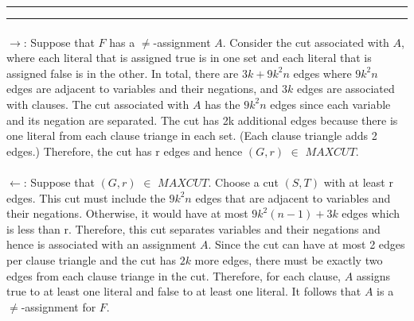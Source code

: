 \documentclass[11pt]{article}
\newcounter{questionCounter}
\newcounter{partCounter}[questionCounter]
\newenvironment{question}[2][\arabic{questionCounter}]{%
    \setcounter{partCounter}{0}%
    \vspace{.25in} \hrule \vspace{0.5em}%
        \noindent{\bf #2}%
    \vspace{0.8em} \hrule \vspace{.10in}%
    \addtocounter{questionCounter}{1}%
}{}
\begin{document}
\begin{question}{NP-Completeness}
\begin{enumerate}[(a)]
\paragraph{}
$\rightarrow$: Suppose that $F$ has a $\neq$-assignment $A$.  Consider the cut associated with $A$, where each literal that is assigned true is in one set and each literal that is assigned false is in the other.  In total, there are $3k + 9k^{2}n$ edges where $9k^{2}n$ edges are adjacent to variables and their negations, and $3k$ edges are associated with clauses.  The cut associated with $A$ has the $9k^{2}n$ edges since each variable and its negation are separated.  The cut has 2k additional edges because there is one literal from each clause triange in each set.  (Each clause triangle adds 2 edges.)  Therefore, the cut has r edges and hence $(G,r)$ $\in$ $MAXCUT$.

\paragraph{}
$\leftarrow$: Suppose that $(G,r)$ $\in$ $MAXCUT$.  Choose a cut $(S,T)$ with at least r edges.  This cut must include the $9k^{2}n$ edges that are adjacent to variables and their negations.  Otherwise, it would have at most $9k^{2}(n-1) + 3k$ edges which is less than r.  Therefore, this cut separates variables and their negations and hence is associated with an assignment $A$.  Since the cut can have at most 2 edges per clause triangle and the cut has $2k$ more edges, there must be exactly two edges from each clause triange in the cut.  Therefore, for each clause, $A$ assigns true to at least one literal and false to at least one literal.  It follows that $A$ is a $\neq$-assignment for $F$.
\end{enumerate}
\end{question}
\end{document}

